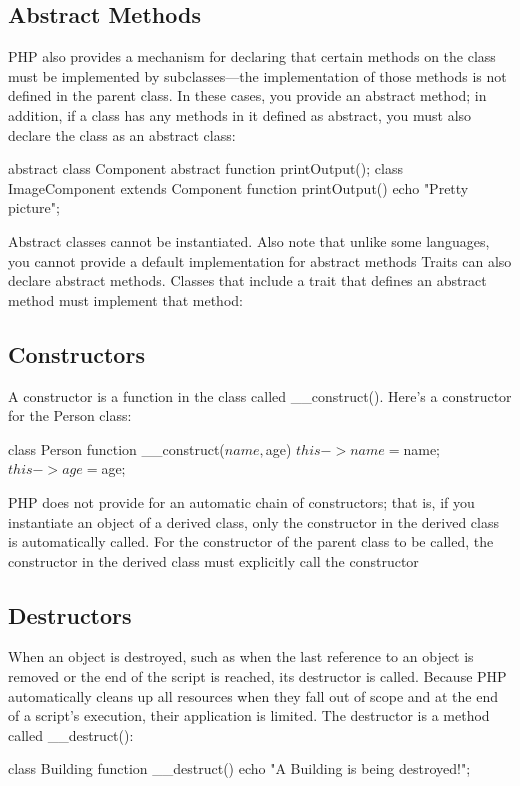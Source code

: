 \documentclass{report}
\begin{document}
\pagebreak 
\bigbreak \noindent 
\subsection{Abstract Methods}
\bigbreak \noindent 
PHP also provides a mechanism for declaring that certain methods on the class must
be implemented by subclasses—the implementation of those methods is not defined
in the parent class. In these cases, you provide an abstract method; in addition, if a class
has any methods in it defined as abstract, you must also declare the class as an abstract
class:
\bigbreak \noindent 
\begin{phpcode}
    abstract class Component
    {
        abstract function printOutput();
    }
    class ImageComponent extends Component
    {
        function printOutput()
        {
            echo "Pretty picture";
        }
    }
\end{phpcode}
\bigbreak \noindent 
Abstract classes cannot be instantiated. Also note that unlike some languages, you cannot provide a default implementation for abstract methods
\bigbreak \noindent 
Traits can also declare abstract methods. Classes that include a trait that defines an abstract method must implement that method:

\bigbreak \noindent 
\subsection{Constructors}
\bigbreak \noindent 
A constructor is a function in the class called \_\_construct(). Here’s a constructor for the Person class:
\bigbreak \noindent 
\begin{phpcode}
    class Person
    {
        function __construct($name, $age)
        {
            $this->name = $name;
            $this->age = $age;
        }
    }
\end{phpcode}
\bigbreak \noindent 
PHP does not provide for an automatic chain of constructors; that is, if you instantiate
an object of a derived class, only the constructor in the derived class is automatically
called. For the constructor of the parent class to be called, the constructor in the derived
class must explicitly call the constructor

\bigbreak \noindent 
\subsection{Destructors}
\bigbreak \noindent 
When an object is destroyed, such as when the last reference to an object is removed
or the end of the script is reached, its destructor is called. Because PHP automatically
cleans up all resources when they fall out of scope and at the end of a script’s execution,
their application is limited. The destructor is a method called \_\_destruct():
\bigbreak \noindent 
\begin{phpcode}
    class Building
    {
        function __destruct()
        {
            echo "A Building is being destroyed!";
        }
    }
\end{phpcode}
\end{document}
